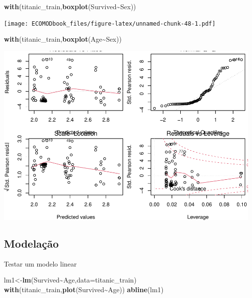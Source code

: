 \documentclass[
]{book}
\newenvironment{Shaded}{\begin{snugshade}}{\end{snugshade}}
\newcommand{\AttributeTok}[1]{\textcolor[rgb]{0.13,0.29,0.53}{#1}}
\newcommand{\FunctionTok}[1]{\textcolor[rgb]{0.13,0.29,0.53}{\textbf{#1}}}
\newcommand{\NormalTok}[1]{#1}
\newcommand{\OtherTok}[1]{\textcolor[rgb]{0.56,0.35,0.01}{#1}}
\newcommand{\SpecialCharTok}[1]{\textcolor[rgb]{0.81,0.36,0.00}{\textbf{#1}}}
\begin{document}
\begin{Shaded}
\begin{Highlighting}[]
\FunctionTok{with}\NormalTok{(titanic\_train,}\FunctionTok{boxplot}\NormalTok{(Survived}\SpecialCharTok{\textasciitilde{}}\NormalTok{Sex))}
\end{Highlighting}
\end{Shaded}

\texttt{[image: ECOMODbook\_files/figure-latex/unnamed-chunk-48-1.pdf]}

\begin{Shaded}
\begin{Highlighting}[]
\FunctionTok{with}\NormalTok{(titanic\_train,}\FunctionTok{boxplot}\NormalTok{(Age}\SpecialCharTok{\textasciitilde{}}\NormalTok{Sex))}
\end{Highlighting}
\end{Shaded}

\includegraphics{ECOMODbook_files/figure-latex/unnamed-chunk-49-1.pdf}

\hypertarget{modelauxe7uxe3o}{%
\subsection{Modelação}\label{modelauxe7uxe3o}}

Testar um modelo linear

\begin{Shaded}
\begin{Highlighting}[]
\NormalTok{lm1}\OtherTok{\textless{}{-}}\FunctionTok{lm}\NormalTok{(Survived}\SpecialCharTok{\textasciitilde{}}\NormalTok{Age,}\AttributeTok{data=}\NormalTok{titanic\_train)}
\FunctionTok{with}\NormalTok{(titanic\_train,}\FunctionTok{plot}\NormalTok{(Survived}\SpecialCharTok{\textasciitilde{}}\NormalTok{Age))}
\FunctionTok{abline}\NormalTok{(lm1)}
\end{Highlighting}
\end{Shaded}
\end{document}
